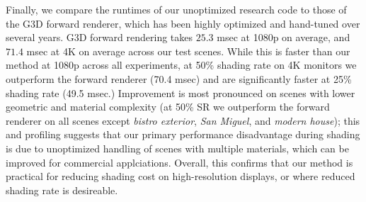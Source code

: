 Finally, we compare the runtimes of our unoptimized research code to those of the G3D forward renderer, which has been highly optimized and hand-tuned over several years. G3D forward rendering takes $25.3$ msec at 1080p on average, and $71.4$ msec at 4K on average across our test scenes. While this is faster than our method at 1080p across all experiments, at 50\% shading rate on 4K monitors we outperform the forward renderer (70.4 msec) and are significantly faster at 25\% shading rate (49.5 msec.) Improvement is most pronounced on scenes with lower geometric and material complexity (at 50\% SR we outperform the forward renderer on all scenes except {\em bistro exterior}, {\em San Miguel}, and {\em modern house}); this and profiling suggests that our primary performance disadvantage during shading is due to unoptimized handling of scenes with multiple materials, which can be improved for commercial applciations. Overall, this confirms that our method is practical for reducing shading cost on high-resolution displays, or where reduced shading rate is desireable. 
 
